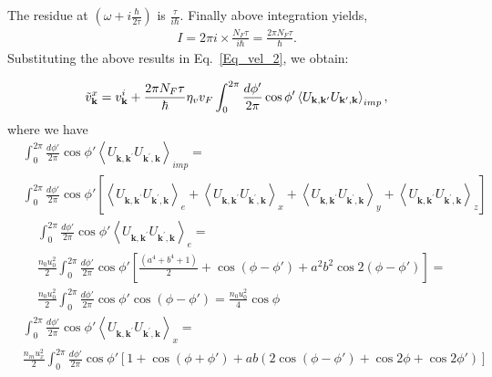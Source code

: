 \documentclass[aps,prb,amsmath,amssymb,footinbib,showpacs,twocolumn]{revtex4-2}
\begin{document}
\begin{widetext}
{The residue at} $(\omega+ i\frac{\hbar}{2\tau})$ is   $\frac{\tau}{i\hbar}$. Finally above integration yields,
\begin{align}
    I = 2\pi i \times\frac{ N_{F}\tau}{i\hbar} 
    = \frac{2\pi  N_{F}\tau}{\hbar}.
\end{align}
Substituting the above results in Eq.~\ref{Eq_vel_2}, we obtain: 

\begin{equation}
   \Tilde{v}^{x}_{\textbf{k}} = v_{\mathbf{k}}^{i}+\frac{2\pi N_{F}\tau}{\hbar}\eta_{v}v_{F}  \int_{0}^{2\pi}\frac{d\phi'}{2\pi}\cos\phi'\left\langle U_{\mathbf{k}, \mathbf{k}^{\prime}} U_{\mathbf{k}^{\prime}, \mathbf{k}}\right\rangle_{imp},
   \label{Eq_vel_3}
\end{equation}
where we have
\begin{align}
     &\int_{0}^{2\pi}\frac{d\phi'}{2\pi}\cos\phi'\left\langle U_{\mathbf{k}, \mathbf{k}^{\prime}} U_{\mathbf{k}^{\prime}, \mathbf{k}}\right\rangle_{imp} =\nonumber\\ & \int_{0}^{2\pi}\frac{d\phi'}{2\pi}\cos\phi'\left[\left\langle U_{\mathbf{k}, \mathbf{k}^{\prime}} U_{\mathbf{k}^{\prime}, \mathbf{k}}\right\rangle_{e}+\left\langle U_{\mathbf{k}, \mathbf{k}^{\prime}} U_{\mathbf{k}^{\prime}, \mathbf{k}}\right\rangle_{x}+\left\langle U_{\mathbf{k}, \mathbf{k}^{\prime}} U_{\mathbf{k}^{\prime}, \mathbf{k}}\right\rangle_{y}+\left\langle U_{\mathbf{k}, \mathbf{k}^{\prime}} U_{\mathbf{k}^{\prime}, \mathbf{k}}\right\rangle_{z}\right]
\end{align}
\begin{align}
    &\int_{0}^{2\pi}\frac{d\phi'}{2\pi}\cos\phi'\left\langle U_{\mathbf{k}, \mathbf{k}^{\prime}} U_{\mathbf{k}^{\prime}, \mathbf{k}}\right\rangle_{e} =\nonumber\\&\frac{n_{0}u_{0}^{2}}{2} \int_{0}^{2\pi}\frac{d\phi'}{2\pi}\cos\phi'\left[\frac{(a^{4}+b^{4}+1)}{2}+\cos(\phi-\phi')+a^{2}b^{2}\cos2(\phi-\phi')\right]=\nonumber \\&
     \frac{n_{0}u_{0}^{2}}{2} \int_{0}^{2\pi}\frac{d\phi'}{2\pi}\cos\phi'\cos(\phi-\phi')
    = \frac{n_{0}u_{0}^{2}}{4}\cos\phi
\end{align}
\begin{align}
     &\int_{0}^{2\pi}\frac{d\phi'}{2\pi}\cos\phi'\left\langle U_{\mathbf{k}, \mathbf{k}^{\prime}} U_{\mathbf{k}^{\prime}, \mathbf{k}}\right\rangle_{x} =\nonumber\\& \frac{n_{m}u^{2}_{x}}{2}\int_{0}^{2\pi}\frac{d\phi'}{2\pi}\cos\phi' \left[1+\cos(\phi+\phi')+ab(2\cos(\phi-\phi')+\cos2\phi+\cos2\phi')\right]

\end{align}
\end{widetext}
\end{document}

